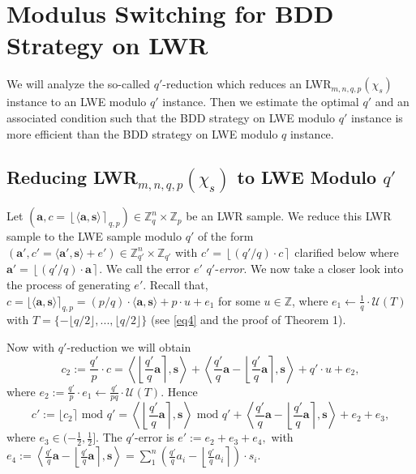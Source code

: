 \documentclass[runningheads]{llncs}
\begin{document}
\section{Modulus Switching for BDD Strategy on LWR} \label{sec5}
 We will analyze the so-called $q'$-reduction which reduces an LWR$_{m,n,q,p}(\chi_s)$ instance to an LWE modulo $q'$ instance. Then we estimate the optimal $q'$ and an associated condition such that the BDD strategy on LWE modulo $q'$ instance is more efficient than the BDD strategy on LWE modulo $q$ instance. 

\subsection{Reducing LWR$_{m,n,q,p}(\chi_s)$ to LWE Modulo $q'$}

Let
$(\mathbf{a}, c=\left\lfloor \langle \mathbf{a},\mathbf{s} \rangle \right\rceil_{q,p}) \in \mathbb{Z}_q^{n} \times \mathbb{Z}_p$  be an LWR sample. We reduce this LWR sample to the LWE sample modulo $q'$ of the form $(\mathbf{a}',c'=\langle \mathbf{a}',\mathbf{s} \rangle+e') \in \mathbb{Z}_{q'}^{n} \times \mathbb{Z}_{q'}$ with
$
c'=\left \lfloor (q'/q) \cdot c \right \rceil
$ clarified below
where $\mathbf{a}'=\left\lfloor (q'/q)\cdot \mathbf{a} \right\rceil$. We call the error $e'$ $q'$-\textit{error}. We now take a closer look into the process of generating $e'$. Recall that,
$c=\lfloor \langle \mathbf{a}, \mathbf{s} \rangle \rceil_{q,p} =({p}/{q})\cdot \langle \mathbf{a}, \mathbf{s} \rangle+p\cdot u+e_1$
for some $u\in \mathbb{Z}$, where $e_1 \leftarrow \frac{1}{q}\cdot \mathcal{U} \left(T \right )$ with $T=\{-\lfloor q/2 \rfloor,...,\lfloor q/2 \rfloor \}$ (see \eqref{eq4} and the proof of Theorem 1).


Now with $q'$-reduction we will obtain
\begin{equation*}
c_2:=\frac{q'}{p}\cdot c=\left \langle \left \lfloor \frac{q'}{q}\mathbf{a} \right \rceil, \mathbf{s} \right\rangle +\left \langle \frac{q'}{q} \mathbf{a}-  \left \lfloor \frac{q'}{q} \mathbf{a}\right \rceil , \mathbf{s} \right\rangle +q'\cdot u+e_2,
\end{equation*}
where $e_2:=\frac{q'}{p}\cdot e_1 \leftarrow \frac{q'}{pq} \cdot  \mathcal{U}(T).$ Hence
\begin{equation*}
c':=\lfloor c_2 \rceil \text{ mod }q'=\left \langle \left \lfloor \frac{q'}{q}\mathbf{a} \right \rceil, \mathbf{s} \right\rangle \text{ mod }q' +\left \langle \frac{q'}{q} \mathbf{a}-  \left \lfloor \frac{q'}{q} \mathbf{a}\right \rceil , \mathbf{s} \right\rangle +e_2+e_3,
\end{equation*}
where $e_3 \in(-\frac{1}{2}, \frac{1}{2}].$ The $q'$-error is 
$e':=e_2+e_3+e_4,$
with $e_4:=\left \langle \frac{q'}{q} \mathbf{a}-  \left \lfloor \frac{q'}{q} \mathbf{a}\right \rceil , \mathbf{s} \right\rangle=\sum_{1}^{n}\left( \frac{q'}{q} a_i-  \left \lfloor \frac{q'}{q} a_i\right \rceil  \right)\cdot s_i$. 
\end{document}
